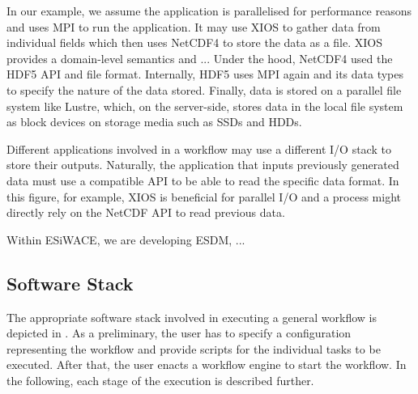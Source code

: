 \documentclass{superfri}
\newcommand{\jk}[1]{\todo[inline]{JK: #1}}
\begin{document}

In our example, we assume the application is parallelised for performance reasons and uses MPI to run the application.
It may use XIOS to gather data from individual fields which then uses NetCDF4 to store the data as a file.
XIOS provides a domain-level semantics and ...\jk{TODO}
Under the hood, NetCDF4 used the HDF5 API and file format.
Internally, HDF5 uses MPI again and its data types to specify the nature of the data stored.
Finally, data is stored on a parallel file system like Lustre, which, on the server-side, stores data in the local file system as block devices on storage media such as SSDs and HDDs.

Different applications involved in a workflow may use a different I/O stack to store their outputs.
Naturally, the application that inputs previously generated data must use a compatible API to be able to read the specific data format.
In this figure, for example, XIOS is beneficial for parallel I/O and a process might directly rely on the NetCDF API to read previous data.

Within ESiWACE, we are developing ESDM, ... \jk{TODO}

\subsection{Software Stack}

The appropriate software stack involved in executing a general workflow is depicted in .
As a preliminary, the user has to specify a configuration representing the workflow and provide scripts for the individual tasks to be executed. After that, the user enacts a workflow engine to start the workflow.
In the following, each stage of the execution is described further.

\end{document}
